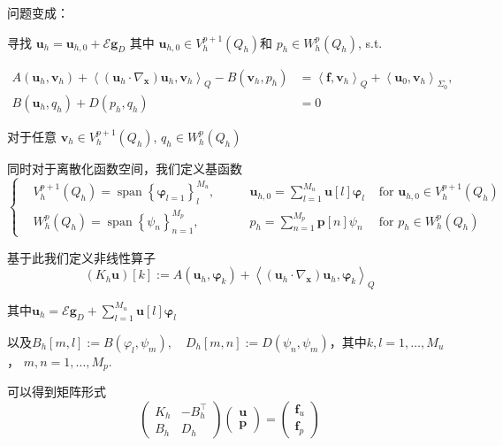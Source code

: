 问题变成：
\begin{tcolorbox}
寻找 $\boldsymbol{u}_{h}=\boldsymbol{u}_{h, 0}+\mathcal{E} \boldsymbol{g}_{D}$ 其中 $\boldsymbol{u}_{h, 0} \in V_{h}^{p+1}\left(Q_h\right)$和 $p_{h} \in W_{h}^{p}\left(Q_h\right)$, s.t.

$$\begin{aligned}
A\left(\boldsymbol{u}_{h}, \boldsymbol{v}_{h}\right)+\left\langle\left(\boldsymbol{u}_{h} \cdot \nabla_{\boldsymbol{x}}\right) \boldsymbol{u}_{h}, \boldsymbol{v}_{h}\right\rangle_{Q}-B\left(\boldsymbol{v}_{h}, p_{h}\right) & =\left\langle\boldsymbol{f}, \boldsymbol{v}_{h}\right\rangle_{Q}+\left\langle\boldsymbol{u}_{0}, \boldsymbol{v}_{h}\right\rangle_{\Sigma_{0}}, \\
B\left(\boldsymbol{u}_{h}, q_{h}\right)+D\left(p_{h}, q_{h}\right) & =0
\end{aligned}$$

对于任意 $\boldsymbol{v}_{h} \in V_{h}^{p+1}\left(Q_h\right)$,  $q_{h} \in W_{h}^{p}\left(Q_h\right)$ 
\end{tcolorbox}


同时对于离散化函数空间，我们定义基函数
$$\left\{\begin{aligned}
    &V_{h}^{p+1}\left(Q_h\right)=\operatorname{span}\left\{\boldsymbol{\varphi}_{l=1}\right\}_{l}^{M_{u}}, \qquad& \boldsymbol{u}_{h, 0}=\sum_{l=1}^{M_{u}} \boldsymbol{u}[l] \boldsymbol{\varphi}_{l} & \text { for } \boldsymbol{u}_{h, 0} \in V_{h}^{p+1}\left(Q_h\right) \\
    &W_{h}^{p}\left(Q_h\right)=\operatorname{span}\left\{\psi_{n}\right\}_{n=1}^{M_{p}}, \qquad & p_{h}=\sum_{n=1}^{M_{p}} \boldsymbol{p}[n] \psi_{n} & \text { for } p_{h} \in W_{h}^{p}\left(Q_h\right)
\end{aligned}\right.$$

基于此我们定义非线性算子
$$\left(K_{h} \boldsymbol{u}\right)[k]:=A\left(\boldsymbol{u}_{h}, \boldsymbol{\varphi}_{k}\right)+\left\langle\left(\boldsymbol{u}_{h} \cdot \nabla_{\boldsymbol{x}}\right) \boldsymbol{u}_{h}, \boldsymbol{\varphi}_{k}\right\rangle_{Q}$$

其中$\boldsymbol{u}_{h}=\mathcal{E} \boldsymbol{g}_{D}+\sum_{l=1}^{M_{u}} \boldsymbol{u}[l] \boldsymbol{\varphi}_{l}$ 

以及$B_{h}[m, l]:=B\left(\varphi_{l}, \psi_{m}\right), \quad D_{h}[m, n]:=D\left(\psi_{n}, \psi_{m}\right)$，其中$k, l=1, \ldots, M_{u}$， $m, n=1, \ldots, M_{p}$. 

可以得到矩阵形式
$$\left(\begin{array}{cc}
K_{h} & -B_{h}^{\top} \\
B_{h} & D_{h}
\end{array}\right)\left(\begin{array}{l}
\boldsymbol{u} \\
\boldsymbol{p}
\end{array}\right)=\left(\begin{array}{l}
\boldsymbol{f}_{u} \\
\boldsymbol{f}_{p}
\end{array}\right)$$

